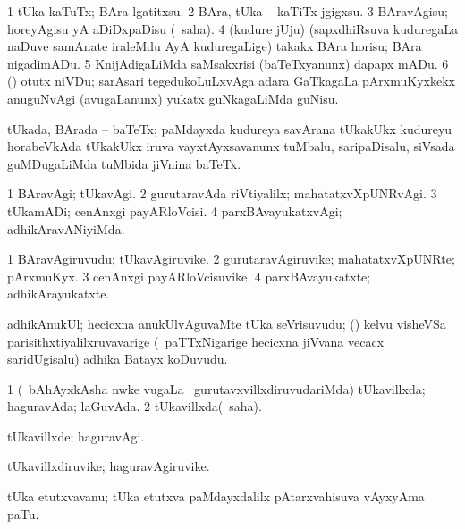 {{{\bentry
{} 
\gl{\sakirx}
\expl{}
\bmng
\bnum
\num{1} tUka kaTuTx; BAra lgatitxsu. 
\num{2} BAra, tUka -- kaTiTx jgigxsu. 
\num{3} BAravAgisu; horeyAgisu yA aDiDxpaDisu (\rUpa\ saha). 
\num{4} (kudure jUju) (sapxdhiRsuva kuduregaLa naDuve samAnate iraleMdu AyA kuduregaLige) takakx BAra horisu; BAra nigadimADu. 
\num{5} KnijAdigaLiMda saMsakxrisi (baTeTxyanunx) dapapx mADu. 
\num{6} (\saMshA) otutx niVDu; sarAsari tegedukoLuLxvAga adara GaTkagaLa pArxmuKyxkekx anuguNvAgi (avugaLanunx) yukatx guNkagaLiMda guNisu. 
\enum
\emng
\eentry

\bentry
{} 
\gl{\nA}
\expl{}
\bmng
tUkada, BArada -- baTeTx; paMdayxda kudureya savArana tUkakUkx kudureyu horabeVkAda tUkakUkx iruva vayxtAyxsavanunx tuMbalu, saripaDisalu, siVsada guMDugaLiMda tuMbida jiVnina baTeTx. 
\emng
\eentry

\bentry
{} 
\gl{\kirxvi}
\expl{}
\bmng
\bnum
\num{1} BAravAgi; tUkavAgi. 
\num{2} gurutaravAda riVtiyalilx; mahatatxvXpUNRvAgi. 
\num{3} tUkamADi; cenAnxgi payARloVcisi. 
\num{4} parxBAvayukatxvAgi; adhikAravANiyiMda. 
\enum
\emng
\eentry

\bentry
{} 
\gl{\nA}
\expl{}
\bmng
\bnum
\num{1} BAravAgiruvudu; tUkavAgiruvike. 
\num{2} gurutaravAgiruvike; mahatatxvXpUNRte; pArxmuKyx. 
\num{3} cenAnxgi payARloVcisuvike. 
\num{4} parxBAvayukatxte; adhikArayukatxte. 
\enum
\emng
\eentry

\bentry
{} 
\gl{\nA}
\expl{}
\bmng
adhikAnukUl; hecicxna anukUlvAguvaMte tUka seVrisuvudu; (\kanmu) kelvu visheVSa parisithxtiyalilxruvavarige (\udA\ paTTxNigarige hecicxna jiVvana vecacx saridUgisalu) adhika Batayx koDuvudu. 
\emng
\eentry

\bentry
{} 
\gl{\gu}
\expl{}
\bmng
\bnum
\num{1} (\kanmu\ bAhAyxkAsha nwke \mo vugaLa \vi\ gurutavxvillxdiruvudariMda) tUkavillxda; haguravAda; laGuvAda. 
\num{2} tUkavillxda(\rUpa\ saha). 
\enum
\emng
\eentry

\bentry
{} 
\gl{\kirxvi}
\expl{}
\bmng
tUkavillxde; haguravAgi. 
\emng
\eentry

\bentry
{} 
\gl{\nA}
\expl{}
\bmng
tUkavillxdiruvike; haguravAgiruvike. 
\emng
\eentry

\bentry
{} 
\gl{\nA}
\expl{}
\bmng
tUka etutxvavanu; tUka etutxva paMdayxdalilx pAtarxvahisuva vAyxyAma paTu. 
\emng
\eentry

}}}
